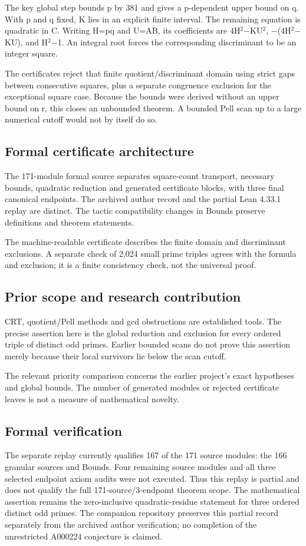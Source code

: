 \documentclass[11pt,a4paper]{article}
\begin{document}
The key global step bounds p by 381 and gives a p-dependent upper bound on q. With p and q fixed, K lies in an explicit finite interval. The remaining equation is quadratic in C. Writing H=pq and U=AB, its coefficients are 4H\ensuremath{^2}\ensuremath{-}KU\ensuremath{^2}, \ensuremath{-}(4H\ensuremath{^2}\ensuremath{-}KU), and H\ensuremath{^2}\ensuremath{-}1. An integral root forces the corresponding discriminant to be an integer square.

The certificates reject that finite quotient/discriminant domain using strict gaps between consecutive squares, plus a separate congruence exclusion for the exceptional square case. Because the bounds were derived without an upper bound on r, this closes an unbounded theorem. A bounded Pell scan up to a large numerical cutoff would not by itself do so.

\subsection{Formal certificate architecture}
The 171-module formal source separates square-count transport, necessary bounds, quadratic reduction and generated certificate blocks, with three final canonical endpoints. The archived author record and the partial Lean 4.33.1 replay are distinct. The tactic compatibility changes in Bounds preserve definitions and theorem statements.

The machine-readable certificate describes the finite domain and discriminant exclusions. A separate check of 2,024 small prime triples agrees with the formula and exclusion; it is a finite consistency check, not the universal proof.

\subsection{Prior scope and research contribution}
CRT, quotient/Pell methods and gcd obstructions are established tools. The precise assertion here is the global reduction and exclusion for every ordered triple of distinct odd primes. Earlier bounded scans do not prove this assertion merely because their local survivors lie below the scan cutoff.

The relevant priority comparison concerns the earlier project's exact hypotheses and global bounds. The number of generated modules or rejected certificate leaves is not a measure of mathematical novelty.

\subsection{Formal verification}
The separate replay currently qualifies 167 of the 171 source modules: the 166 granular sources and Bounds. Four remaining source modules and all three selected endpoint axiom audits were not executed. Thus this replay is partial and does not qualify the full 171-source/3-endpoint theorem scope. The mathematical assertion remains the zero-inclusive quadratic-residue statement for three ordered distinct odd primes. The companion repository preserves this partial record separately from the archived author verification; no completion of the unrestricted A000224 conjecture is claimed.
\end{document}
